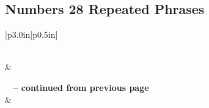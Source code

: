 \subsection{Numbers 28 Repeated Phrases}


\normalsize
 
\begin{center}
\begin{longtable}{|p{3.0in}|p{0.5in}|}
\caption[Numbers 28 Repeated Phrases]{Numbers 28 Repeated Phrases}\label{table:Repeated Phrases Numbers 28} \\
\hline {} &  \\ \hline 
\endfirsthead
 
{{\bfseries \tablename\ \thetable{} -- continued from previous page}} \\  
\hline {} &  \\ \hline 
\endhead
 

\end{longtable}
\end{center}
